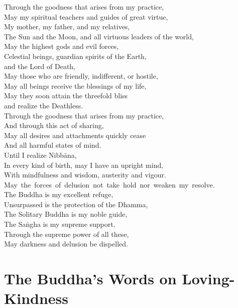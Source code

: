Through the goodness that arises from my practice,\\
May my spiritual teachers and guides of great virtue,\\
My mother, my father, and my relatives,\\
The Sun and the Moon, and all virtuous leaders of the world,\\
May the highest gods and evil forces,\\
Celestial beings, guardian spirits of the Earth,\\\vin and the Lord of Death,\\
May those who are friendly, indifferent, or hostile,\\
May all beings receive the blessings of my life,\\
May they soon attain the threefold bliss\\\vin and realize the Deathless.\\
Through the goodness that arises from my practice,\\
And through this act of sharing,\\
May all desires and attachments quickly cease\\
And all harmful states of mind.\\
Until I realize Nibbāna,\\
In every kind of birth, may I have an upright mind,\\
With mindfulness and wisdom, austerity and vigour.\\
\mbox{May the forces of delusion not take hold nor weaken my resolve.}\\
The Buddha is my excellent refuge,\\
Unsurpassed is the protection of the Dhamma,\\
The Solitary Buddha is my noble guide,\\
The Saṅgha is my supreme support.\\
Through the supreme power of all these,\\
May darkness and delusion be dispelled.

\section{The Buddha's Words on Loving-Kindness}

\begin{leader}
\end{leader}


